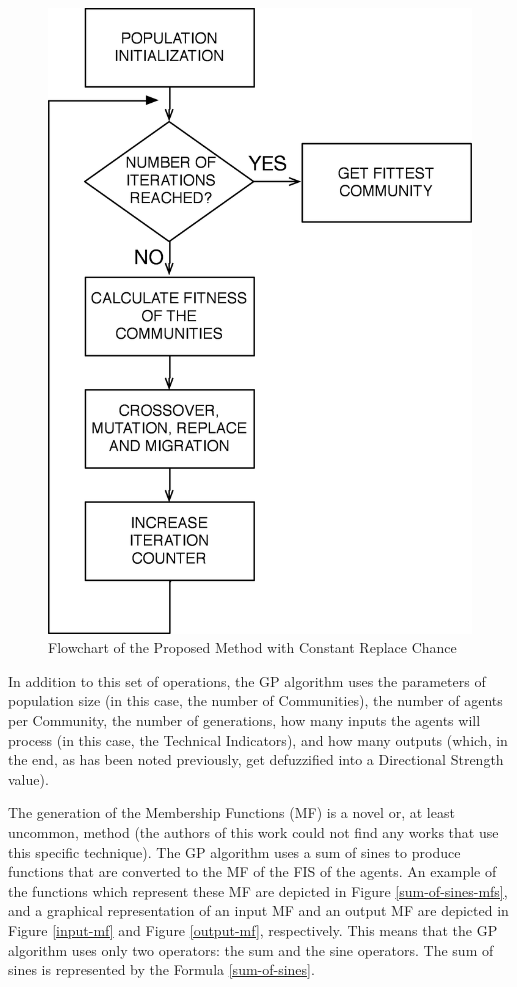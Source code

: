 \documentclass[12pt,journal,draftcls,onecolumn]{IEEEtran}
\begin{document}
\begin{figure}[h!]
\caption{Flowchart of the Proposed Method with Constant Replace Chance}
\label{flowchart-without-dynamic}
\begin{center}
\includegraphics[width=0.4\columnwidth]{figures/flowchart-without/flowchart-without.png}
\end{center}
\end{figure}

In addition to this set of operations, the GP algorithm uses the parameters of population size (in this case, the number of Communities), the number of agents per Community, the number of generations, how many inputs the agents will process (in this case, the Technical Indicators), and how many outputs (which, in the end, as has been noted previously, get defuzzified into a Directional Strength value).

The generation of the Membership Functions (MF) is a novel or, at
least uncommon, method (the authors of this work could not find any
works that use this specific technique). The GP algorithm uses a sum
of sines to produce functions that are converted to the MF of the FIS
of the agents. An example of the functions which represent these MF
are depicted in Figure \ref{sum-of-sines-mfs}, and a graphical
representation of an input MF and an output MF are depicted in Figure
\ref{input-mf} and Figure \ref{output-mf}, respectively. This means
that the GP algorithm uses only two operators: the sum and the sine
operators. The sum of sines is represented by the Formula
\ref{sum-of-sines}.
\end{document}

